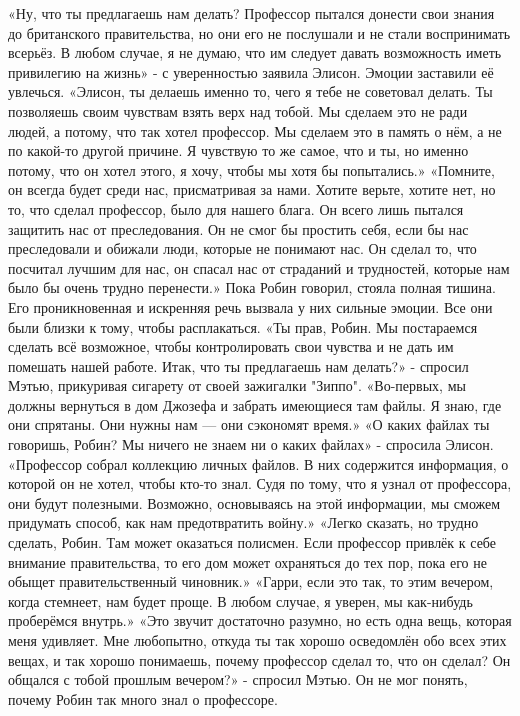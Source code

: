 \documentclass[a4paper,12pt]{book}
\begin{document}
	«Ну, что ты предлагаешь нам делать? Профессор пытался донести свои знания до британского правительства, но они его не послушали и не стали воспринимать всерьёз. В любом случае, я не думаю, что им следует давать возможность иметь привилегию на жизнь» - с уверенностью заявила Элисон. Эмоции заставили её увлечься.
	«Элисон, ты делаешь именно то, чего я тебе не советовал делать. Ты позволяешь своим чувствам взять верх над тобой. Мы сделаем это не ради людей, а потому, что так хотел профессор. Мы сделаем это в память о нём, а не по какой-то другой причине. Я чувствую то же самое, что и ты, но именно потому, что он хотел этого, я хочу, чтобы мы хотя бы попытались.»
	«Помните, он всегда будет среди нас, присматривая за нами. Хотите верьте, хотите нет, но то, что сделал профессор, было для нашего блага. Он всего лишь пытался защитить нас от преследования. Он не смог бы простить себя, если бы нас преследовали и обижали люди, которые не понимают нас. Он сделал то, что посчитал лучшим для нас, он спасал нас от страданий и трудностей, которые нам было бы очень трудно перенести.»
	Пока Робин говорил, стояла полная тишина. Его проникновенная и искренняя речь вызвала у них сильные эмоции. Все они были близки к тому, чтобы расплакаться.
	«Ты прав, Робин. Мы постараемся сделать всё возможное, чтобы контролировать свои чувства и не дать им помешать нашей работе. Итак, что ты предлагаешь нам делать?» - спросил Мэтью, прикуривая сигарету от своей зажигалки "Зиппо".
	«Во-первых, мы должны вернуться в дом Джозефа и забрать имеющиеся там файлы. Я знаю, где они спрятаны. Они нужны нам — они сэкономят время.»
	«О каких файлах ты говоришь, Робин? Мы ничего не знаем ни о каких файлах» - спросила Элисон.
	«Профессор собрал коллекцию личных файлов. В них содержится информация, о которой он не хотел, чтобы кто-то знал. Судя по тому, что я узнал от профессора, они будут полезными. Возможно, основываясь на этой информации, мы сможем придумать способ, как нам предотвратить войну.»
	«Легко сказать, но трудно сделать, Робин. Там может оказаться полисмен. Если профессор привлёк к себе внимание правительства, то его дом может охраняться до тех пор, пока его не обыщет правительственный чиновник.»
	«Гарри, если это так, то этим вечером, когда стемнеет, нам будет проще. В любом случае, я уверен, мы как-нибудь проберёмся внутрь.»
	«Это звучит достаточно разумно, но есть одна вещь, которая меня удивляет. Мне любопытно, откуда ты так хорошо осведомлён обо всех этих вещах, и так хорошо понимаешь, почему профессор сделал то, что он сделал? Он общался с тобой прошлым вечером?» - спросил Мэтью. Он не мог понять, почему Робин так много знал о профессоре.
\end{document}
